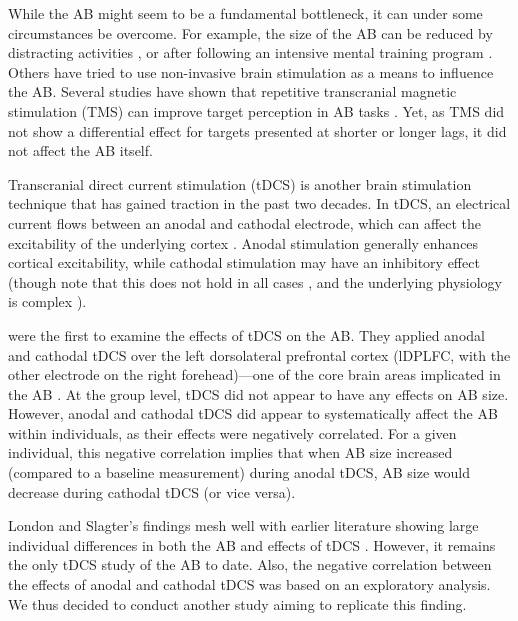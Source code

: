\documentclass[11pt,english,]{memoir}
\begin{document}
While the AB might seem to be a fundamental bottleneck, it can under some circumstances be overcome. For example, the size of the AB can be reduced by distracting activities \autocites{Olivers2005}{Olivers2006}{Thomson2015a}, or after following an intensive mental training program \autocite{Slagter2007}. Others have tried to use non-invasive brain stimulation \autocite{Dayan2013} as a means to influence the AB. Several studies have shown that repetitive transcranial magnetic stimulation (TMS) can improve target perception in AB tasks \autocites{Cooper2004}{Arasanz2012}{Esterman2017}. Yet, as TMS did not show a differential effect for targets presented at shorter or longer lags, it did not affect the AB itself.

Transcranial direct current stimulation (tDCS) is another brain stimulation technique that has gained traction in the past two decades. In tDCS, an electrical current flows between an anodal and cathodal electrode, which can affect the excitability of the underlying cortex \autocite{Gebodh2019a}. Anodal stimulation generally enhances cortical excitability, while cathodal stimulation may have an inhibitory effect \autocites{Nitsche2000}{Nitsche2001} (though note that this does not hold in all cases \autocite{Parkin2018}, and the underlying physiology is complex \autocites{Bikson2019}{Liu2018}{Stagg2018}).

\textcite{London2015} were the first to examine the effects of tDCS on the AB. They applied anodal and cathodal tDCS over the left dorsolateral prefrontal cortex (lDPLFC, with the other electrode on the right forehead)---one of the core brain areas implicated in the AB \autocites{Slagter2010}{Hommel2006}. At the group level, tDCS did not appear to have any effects on AB size. However, anodal and cathodal tDCS did appear to systematically affect the AB within individuals, as their effects were negatively correlated. For a given individual, this negative correlation implies that when AB size increased (compared to a baseline measurement) during anodal tDCS, AB size would decrease during cathodal tDCS (or vice versa).

London and Slagter's \autocite*{London2015} findings mesh well with earlier literature showing large individual differences in both the AB \autocite{Willems2016} and effects of tDCS \autocite{Krause2014}. However, it remains the only tDCS study of the AB to date. Also, the negative correlation between the effects of anodal and cathodal tDCS was based on an exploratory analysis. We thus decided to conduct another study aiming to replicate this finding.
\end{document}
